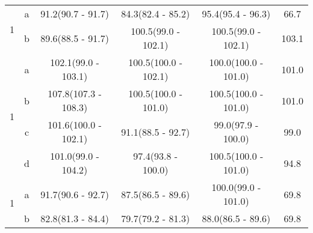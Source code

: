 \begin{table}[H]
\begin{tabular}{c|c|c|c|c|c}
\multirow{2}{*}{1} & a & 91.2(90.7 - 91.7) & 84.3(82.4 - 85.2) & 95.4(95.4 - 96.3) & 66.7\\ 
 & b & 89.6(88.5 - 91.7) & 100.5(99.0 - 102.1) & 100.5(99.0 - 102.1) & 103.1\\ 
\hline

\multirow{4}{*}{1} & a & 102.1(99.0 - 103.1) & 100.5(100.0 - 102.1) & 100.0(100.0 - 101.0) & 101.0\\ 
 & b & 107.8(107.3 - 108.3) & 100.5(100.0 - 101.0) & 100.5(100.0 - 101.0) & 101.0\\ 
 & c & 101.6(100.0 - 102.1) & 91.1(88.5 - 92.7) & 99.0(97.9 - 100.0) & 99.0\\ 
 & d & 101.0(99.0 - 104.2) & 97.4(93.8 - 100.0) & 100.5(100.0 - 101.0) & 94.8\\ 
\hline

\multirow{2}{*}{1} & a & 91.7(90.6 - 92.7) & 87.5(86.5 - 89.6) & 100.0(99.0 - 101.0) & 69.8\\ 
 & b & 82.8(81.3 - 84.4) & 79.7(79.2 - 81.3) & 88.0(86.5 - 89.6) & 69.8\\ 



		\hline\hline
		
	\end{tabular}
	\label{tab:resultsComplex}
\end{table}